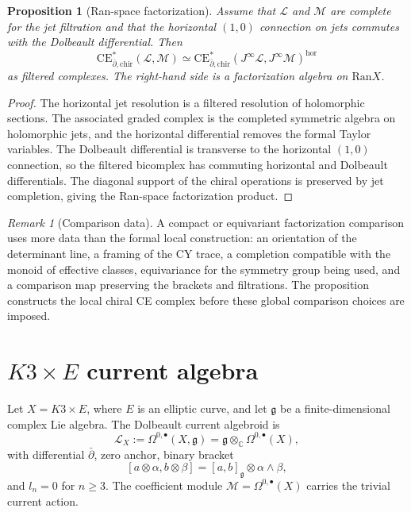 \documentclass[11pt]{amsart}
\providecommand{\C}{\mathbb{C}}
\providecommand{\dbar}{\bar{\partial}}
\providecommand{\g}{\mathfrak{g}}
\providecommand{\CE}{\mathrm{CE}}
\providecommand{\chir}{\mathrm{chir}}
\providecommand{\Ran}{\mathrm{Ran}}
\providecommand{\cL}{\mathcal{L}}
\providecommand{\cM}{\mathcal{M}}
\providecommand{\Jet}{J^\infty}
\theoremstyle{plain}
\newtheorem{proposition}[theorem]{Proposition}
\theoremstyle{definition}
\theoremstyle{remark}
\newtheorem{remark}[theorem]{Remark}
\begin{document}
\begin{proposition}[Ran-space factorization]\label{prop:ran-locality}
Assume that $\cL$ and $\cM$ are complete for the jet filtration and that
the horizontal $(1,0)$ connection on jets commutes with the Dolbeault
differential. Then
\[
  \CE_{\dbar,\chir}^{*}(\cL,\cM)
  \simeq
  \CE_{\dbar,\chir}^{*}(\Jet\cL,\Jet\cM)^{\mathrm{hor}}
\]
as filtered complexes. The right-hand side is a factorization algebra on
$\Ran X$.
\end{proposition}

\begin{proof}
The horizontal jet resolution is a filtered resolution of holomorphic
sections. The associated graded complex is the completed symmetric
algebra on holomorphic jets, and the horizontal differential removes the
formal Taylor variables. The Dolbeault differential is transverse to the
horizontal $(1,0)$ connection, so the filtered bicomplex has commuting
horizontal and Dolbeault differentials. The diagonal support of the
chiral operations is preserved by jet completion, giving the Ran-space
factorization product.
\end{proof}

\begin{remark}[Comparison data]\label{rem:comparison-data}
A compact or equivariant factorization comparison uses more data than
the formal local construction: an orientation of the determinant line,
a framing of the CY trace, a completion compatible with the monoid of
effective classes, equivariance for the symmetry group being used, and
a comparison map preserving the brackets and filtrations. The proposition
constructs the local chiral CE complex before these global comparison
choices are imposed.
\end{remark}

\section{\texorpdfstring{$K3\times E$}{K3xE} current algebra}

Let $X=K3\times E$, where $E$ is an elliptic curve, and let $\g$ be a
finite-dimensional complex Lie algebra. The Dolbeault current
algebroid is
\[
  \cL_X:=\Omega^{0,\bullet}(X,\g)
  =
  \g\otimes_{\C}\Omega^{0,\bullet}(X),
\]
with differential $\dbar$, zero anchor, binary bracket
\[
  [a\otimes\alpha,b\otimes\beta]
  =
  [a,b]_{\g}\otimes\alpha\wedge\beta,
\]
and $l_n=0$ for $n\geq3$. The coefficient module
$\cM=\Omega^{0,\bullet}(X)$ carries the trivial current action.
\end{document}

